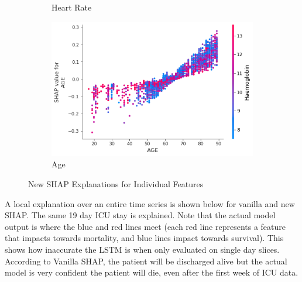 \documentclass[12pt]{article}
\begin{document}
\begin{figure}[H]
\begin{subfigure}[b]{0.47\textwidth}
         \caption{Heart Rate}
     \end{subfigure}
     \hfill
     \begin{subfigure}[b]{0.47\textwidth}
         \centering
         \includegraphics[width=\linewidth]{New SHAP Global/New SHAP Global forAGE.png}
         \caption{Age}
     \end{subfigure}
     \caption{New SHAP Explanations for Individual Features}
\end{figure}

A local explanation over an entire time series is shown below for vanilla and new SHAP. The same 19 day ICU stay is explained. Note that the actual model output is where the blue and red lines meet (each red line represents a feature that impacts towards mortality, and blue lines impact towards survival). This shows how inaccurate the LSTM is when only evaluated on single day slices. According to Vanilla SHAP, the patient will be discharged alive but the actual model is very confident the patient will die, even after the first week of ICU data.
\end{document}
